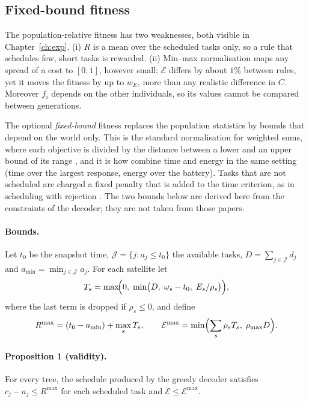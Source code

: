 \subsection{Fixed-bound fitness}
\label{sec:fixed}
The population-relative fitness has two weaknesses, both visible in
Chapter~\ref{ch:exp}. (i) $R$ is a mean over the scheduled tasks only, so a rule
that schedules few, short tasks is rewarded. (ii) Min--max normalisation maps
any spread of a cost to $[0,1]$, however small: $\mathcal{E}$ differs by about
$1\%$ between rules, yet it moves the fitness by up to $w_E$, more than any
realistic difference in $C$. Moreover $f_i$ depends on the other individuals, so
its values cannot be compared between generations.

The optional \emph{fixed-bound} fitness replaces the population statistics by
bounds that depend on the world only. This is the standard normalisation for
weighted sums, where each objective is divided by the distance between a lower
and an upper bound of its range \citep{marler2004survey}, and it is how
\citet{icdcs_sc} combine time and energy in the same setting (time over the
largest response, energy over the battery). Tasks that are not scheduled are
charged a fixed penalty that is added to the time criterion, as in scheduling
with rejection \citep{shabtay2013rejection}. The two bounds below are derived
here from the constraints of the decoder; they are not taken from those papers.

\paragraph{Bounds.} Let $t_0$ be the snapshot time, $\mathcal{J}=\{j: a_j\le t_0\}$
the available tasks, $D=\sum_{j\in\mathcal{J}}d_j$ and $a_{\min}=\min_{j\in\mathcal{J}}a_j$.
For each satellite let
\begin{equation}
  T_s=\max\!\Bigl(0,\;\min\bigl(D,\;\omega_s-t_0,\;E_s/\rho_s\bigr)\Bigr),
  \label{eq:Ts}
\end{equation}
where the last term is dropped if $\rho_s\le0$, and define
\begin{equation}
  R^{\max}=(t_0-a_{\min})+\max_s T_s,\qquad
  \mathcal{E}^{\max}=\min\Bigl(\sum_s\rho_sT_s,\;\rho_{\max}D\Bigr).
  \label{eq:bounds}
\end{equation}

\paragraph{Proposition 1 (validity).} For every tree, the schedule produced by
the greedy decoder satisfies $c_j-a_j\le R^{\max}$ for each scheduled task and
$\mathcal{E}\le\mathcal{E}^{\max}$.

